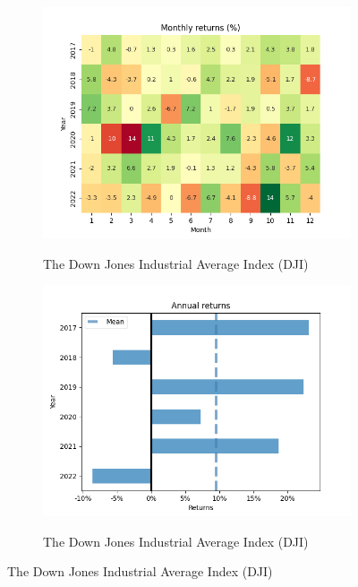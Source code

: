 \documentclass[../xlapes02]{subfiles}
\begin{document}
\begin{figure}
        \vspace{0.5cm}

        \begin{subfigure}[t]{\experimentimgwidth\textwidth}
            \centering
            \includegraphics[width=\linewidth]{image/figure/monthly_returns_heatmap_dji}
            \label{subfig:montly_returns_heatmap_dji}
            \caption{The Down Jones Industrial Average Index (DJI)}
        \end{subfigure}
        \hfill
        \begin{subfigure}[t]{\experimentimgwidth\textwidth}
            \centering
            \includegraphics[width=\linewidth]{image/figure/annual_returns_dji}
            \label{subfig:annual_returns_dji}
            \caption{The Down Jones Industrial Average Index (DJI)}
        \end{subfigure}


\end{figure}
\end{document}
